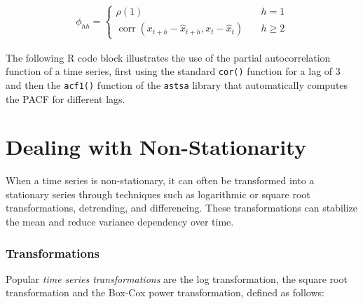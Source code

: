\begin{align*}
\phi_{hh} = \begin{cases}\rho(1) &\quad h = 1 \\
 \operatorname{corr}(x_{t+h} - \hat{x}_{t+h}, x_t - \hat{x}_t) &\quad h \geq 2
 \end{cases}
\end{align*}

The following R code block illustrates the use of the partial autocorrelation function of a time series, first using the standard \texttt{cor()} function for a lag of $3$ and then the \texttt{acf1()} function of the \texttt{astsa} library that automatically computes the PACF for different lags.

\begin{samepage}
\end{samepage}

\section{Dealing with Non-Stationarity}

When a time series is non-stationary, it can often be transformed into a stationary series through techniques such as logarithmic or square root transformations, detrending, and differencing. These transformations can stabilize the mean and reduce variance dependency over time.

\subsubsection*{Transformations}

Popular \emph{time series transformations} are the log transformation, the square root transformation and the Box-Cox power transformation, defined as follows:

